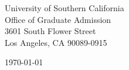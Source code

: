 \begin{minipage}{0.49\textwidth}
\begin{flushleft}
\noindent
University of Southern California \\
Office of Graduate Admission\\
3601 South Flower Street\\
Los Angeles, CA 90089-0915\\

\end{flushleft}
\end{minipage}
\begin{minipage}{0.47\textwidth}
\begin{flushright}
\today
\end{flushright}
\end{minipage} \\

\newcommand{\univ}{University of Southern California}
\newcommand{\univshort}{USC}
\newcommand{\degree}{Ph.D.}
\newcommand{\dept}{Computational Biology and Bioinformatics}



